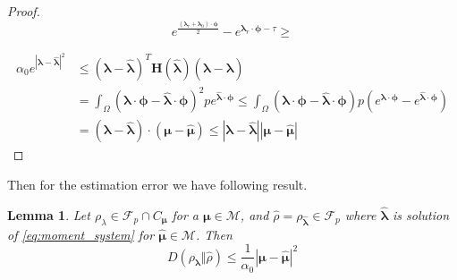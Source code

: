 \documentclass{article}
\newtheorem{lemma}[theorem]{Lemma}
\def\vc#1{\mathbf{\boldsymbol{#1}}}     %
\def\tn#1{\boldsymbol{#1}}
\def\abs#1{|#1|}
\def\vl{{\vc\lambda}}
\def\estvl{{\vc{\hat\lambda}}}
\def\estrho{\hat\rho}
\def\vmu{\vc\mu}
\def\estvmu{{\vc{\hat\mu}}}
\def\vphi{\vc\phi}
\begin{document}
\begin{proof}
\[
 e^\frac{(\vl_r + \vl_0) \cdot \vphi}{2} - e^{\vl_r\cdot\vphi-\tau} \ge 
\]





\begin{align*}
  \alpha_0 e^\abs{\vl - \estvl}^2 &\le  (\vl-\estvl)^T\tn H(\estvl)(\vl -\estvl)\\
  &= \int_\Omega (\vl\cdot\vphi  - \estvl\cdot\vphi)^2 pe^{\estvl\cdot\vphi}
  \le \int_{\Omega} (\vl\cdot\vphi - \estvl\cdot\vphi) 
  p(e^{\vl\cdot\vphi} - e^{\estvl\cdot\vphi})\\
  &=  (\vl - \estvl)\cdot(\vmu - \estvmu) \le \abs{\vl - \estvl}\abs{\vmu - \estvmu}
\end{align*}
\end{proof}




Then for the estimation error we have following result.
\begin{lemma}
  \label{thm:est_error}
  Let $\rho_\lambda \in \mathcal F_p \cap C_{\vmu}$ for a $\vmu \in \mathcal M$, 
  and $\estrho = \rho_{\estvl}\in \mathcal F_p$ 
  where $\estvl$ is solution of \eqref{eq:moment_system} for $\estvmu \in \mathcal M$. Then 
  \[
    D(\rho_{\vl}\Vert \estrho) \le \frac{1}{\alpha_0} \abs{\vmu - \estvmu}^2
  \]
\end{lemma}
\end{document}
